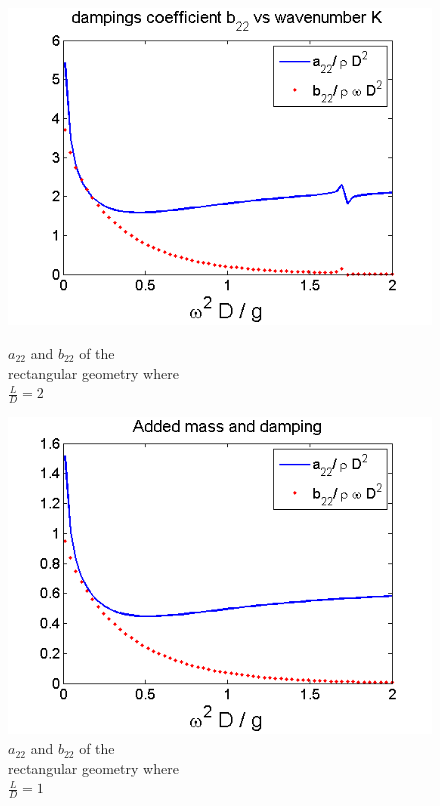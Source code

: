 \documentclass[a4paper,10pt]{article}
\begin{document}
\begin{figure}[H]
  \includegraphics[width=\linewidth]{ad_mass_box1.png}
  \caption{$a_{22}$ and $b_{22}$ of the\\ rectangular geometry where\\ $\frac{L}{D}=2$}\label{add_mass_box1}
\endminipage
{}
  \includegraphics[width=\linewidth]{ad_mass_box2.png}
  \caption{$a_{22}$ and $b_{22}$ of the\\ rectangular geometry where\\ $\frac{L}{D}=1$}\label{add_mass_box2}
\endminipage
{}%

\end{figure}
\end{document}
